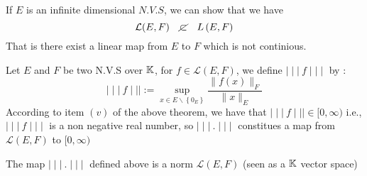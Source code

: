  \begin{remark}[]
 If $E$ is an infinite dimensional $N.V.S$, we can show that 
 we have 
 \[
 \mathcal{L} (E,F) \quad  \cancel{\subset }   \quad 
 L \left( E,F \right)
 \]
That is there exist a linear map from 
$E$ to $F$ which is not continious.
 \end{remark}
 \divider
 Let $E$ and $F$ be two N.V.S over $\mathbb{K}$, 
 for $f \in \mathcal{L} (E,F) $, we define
 $\mid \mid \mid \ f \mid \mid \mid $ by : 
 \[
 \mid \mid \mid \ f \mid \mid \mid  :=
 \sup_{x \in E \backslash \left\{ 0_{E} \right\}} 
 \frac{\| f(x)  \|_{F} }{ \| x \|_{E} }
 \]
 According to item $(v) $ of the above theorem, 
 we have that 
 $\mid \mid \mid \ f \mid \mid \mid  \in 
 [0,\infty )$ i.e., $\mid \mid \mid \ f \mid \mid \mid $ 
 is a non negative real number, so $\mid \mid \mid \ . \mid \mid \mid 
 $ constitues a map from $\mathcal{L} (E,F) $ to
 $[0,\infty)$ 
 \begin{theorem}[]
 The map $\mid \mid \mid \ . \mid \mid \mid $  
 defined above is a norm $\mathcal{L} (E,F) $ (seen as a 
 $\mathbb{K}$ vector space)
 \end{theorem}

